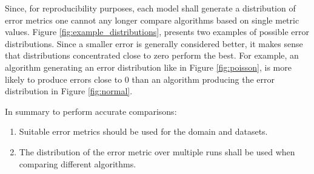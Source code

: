 Since, for reproducibility purposes, each model shall generate a distribution of error metrics one cannot any longer compare algorithms based on single metric values. Figure \ref{fig:example_distributions}, presents two examples of possible error distributions. Since a smaller error is generally considered better, it makes sense that distributions concentrated close to zero perform the best. For example, an algorithm generating an error distribution like in Figure \ref{fig:poisson}, is more likely to produce errors close to 0 than an algorithm producing the error distribution in Figure \ref{fig:normal}.

In summary to perform accurate comparisons:
\begin{enumerate}
  \item Suitable error metrics should be used for the domain and datasets.
  \item The distribution of the error metric over multiple runs shall be used when comparing different algorithms.
\end{enumerate}
